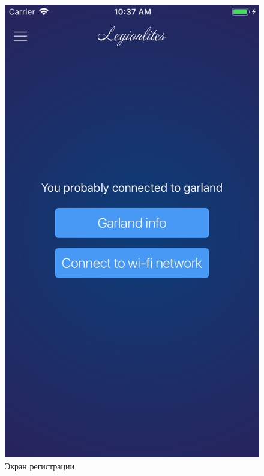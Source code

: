 \begin{figure}[H]
\centering
	\includegraphics[scale=0.2]{figures/userGuide/device.png}
	\caption{Экран регистрации}
	\label{fig:develop:userGuide:device}
\end{figure}
~

